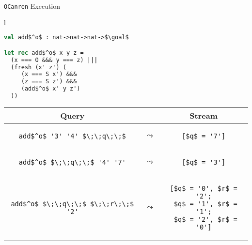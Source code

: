 \documentclass{beamer}
\let\\\tabularnewline
\let\\\tabularnewline
\newcommand{\goal}{\mathfrak G}
\newcommand{\ocanren}{\texttt{OCanren}\xspace}
\theoremstyle{definition}
\begin{document}
\begin{frame}[fragile]{\ocanren Execution}
\begin{center}
\begin{tabular}{l}
 \begin{lstlisting}[mathescape=true,language=ocaml]
val add$^o$ : nat->nat->nat->$\goal$

let rec add$^o$ x y z = 
  (x === O &&& y === z) |||
  (fresh (x' z') (
     (x === S x') &&&
     (z === S z') &&&
     (add$^o$ x' y z')    
  ))
 \end{lstlisting}
 \end{tabular}
 \end{center}

\pause
\vskip3mm

\begin{center}
\begin{tabular}{ccc}
Query & & Stream \\
\hline
  \begin{lstlisting}
add$^o$ '3' '4' $\;\;q\;\;$
  \end{lstlisting} &
$\leadsto$ &
  \begin{lstlisting}
[$q$ = '7']
  \end{lstlisting} \pause\\
\hline
  \begin{lstlisting}
add$^o$ $\;\;q\;\;$ '4' '7'
  \end{lstlisting} &
$\leadsto$ & 
  \begin{lstlisting}
[$q$ = '3']
  \end{lstlisting} \pause\\
\hline
  \begin{lstlisting}
add$^o$ $\;\;q\;\;$ $\;\;r\;\;$ '2'
  \end{lstlisting} &
  $\leadsto$ &
  \begin{lstlisting}
[$q$ = '0', $r$ = '2';
 $q$ = '1', $r$ = '1';
 $q$ = '2', $r$ = '0']
  \end{lstlisting}
\end{tabular}
\end{center}
\end{frame}
\end{document}
